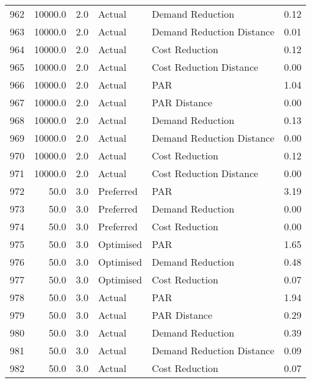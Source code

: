 \begin{longtable}{lrrllr}
962  &      10000.0 &     2.0 &         Actual &           Demand Reduction &   0.12 \\
963  &      10000.0 &     2.0 &         Actual &  Demand Reduction Distance &   0.01 \\
964  &      10000.0 &     2.0 &         Actual &             Cost Reduction &   0.12 \\
965  &      10000.0 &     2.0 &         Actual &    Cost Reduction Distance &   0.00 \\
966  &      10000.0 &     2.0 &         Actual &                        PAR &   1.04 \\
967  &      10000.0 &     2.0 &         Actual &               PAR Distance &   0.00 \\
968  &      10000.0 &     2.0 &         Actual &           Demand Reduction &   0.13 \\
969  &      10000.0 &     2.0 &         Actual &  Demand Reduction Distance &   0.00 \\
970  &      10000.0 &     2.0 &         Actual &             Cost Reduction &   0.12 \\
971  &      10000.0 &     2.0 &         Actual &    Cost Reduction Distance &   0.00 \\
972  &         50.0 &     3.0 &      Preferred &                        PAR &   3.19 \\
973  &         50.0 &     3.0 &      Preferred &           Demand Reduction &   0.00 \\
974  &         50.0 &     3.0 &      Preferred &             Cost Reduction &   0.00 \\
975  &         50.0 &     3.0 &      Optimised &                        PAR &   1.65 \\
976  &         50.0 &     3.0 &      Optimised &           Demand Reduction &   0.48 \\
977  &         50.0 &     3.0 &      Optimised &             Cost Reduction &   0.07 \\
978  &         50.0 &     3.0 &         Actual &                        PAR &   1.94 \\
979  &         50.0 &     3.0 &         Actual &               PAR Distance &   0.29 \\
980  &         50.0 &     3.0 &         Actual &           Demand Reduction &   0.39 \\
981  &         50.0 &     3.0 &         Actual &  Demand Reduction Distance &   0.09 \\
982  &         50.0 &     3.0 &         Actual &             Cost Reduction &   0.07 \\

\end{longtable}
